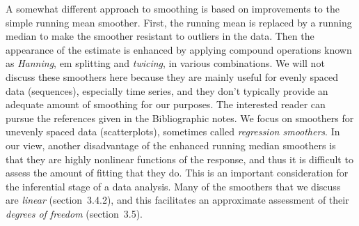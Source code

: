 %
%
%
\Sectionskip{}
A somewhat different approach to smoothing is based  on   
improvements to the simple
running mean smoother.
%
First,
the running mean is replaced by a running median to make the  smoother
   resistant to outliers in the data.
%
%
Then the appearance of the estimate is enhanced by applying compound operations
known as   {\em Hanning}, {em splitting} and {\em twicing}, in various combinations.
%
%
%
We will not discuss these smoothers here because they are mainly
useful for evenly spaced data (sequences), especially time series, and they don't
typically provide an   adequate amount of  smoothing 
for our purposes.
%
%
The interested reader can pursue the references given in the Bibliographic notes.
%
%
We focus on smoothers for unevenly spaced data (scatterplots), sometimes
called {\em regression smoothers}.
In our view,
another disadvantage of the enhanced running median smoothers is that they are
highly nonlinear functions of the response, and thus it is difficult to assess
the amount of fitting that they do.
This is an important consideration for the inferential stage of a data analysis.
%
%
Many of the smoothers that we discuss are {\em linear} (section~3.4.2), and this facilitates
an approximate assessment of their {\em degrees of freedom} (section~3.5).

